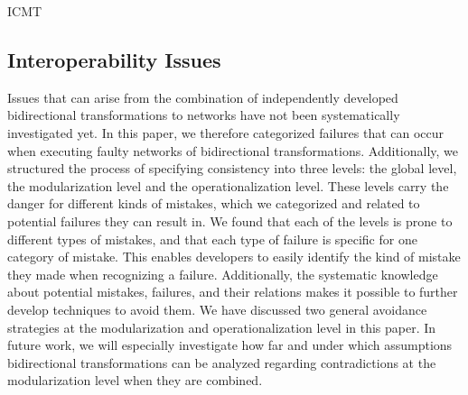 \begin{copiedFrom}{ICMT}

\subsection*{Interoperability Issues}
Issues that can arise from the combination of independently developed bidirectional transformations to networks have not been systematically investigated yet.
In this paper, we therefore categorized failures that can occur when executing faulty networks of bidirectional transformations.
Additionally, we structured the process of specifying consistency into three levels: the global level, the modularization level and the operationalization level.
These levels carry the danger for different kinds of mistakes, which we categorized and related to potential failures they can result in.
We found that each of the levels is prone to different types of mistakes, and that each type of failure is specific for one category of mistake.
This enables developers to easily identify the kind of mistake they made when recognizing a failure.
Additionally, the systematic knowledge about potential mistakes, failures, and their relations makes it possible to further develop techniques to avoid them.
We have discussed two general avoidance strategies at the modularization and operationalization level in this paper.
In future work, we will especially investigate how far and under which assumptions bidirectional transformations can be analyzed regarding contradictions at the modularization level when they are combined.

\end{copiedFrom} %



